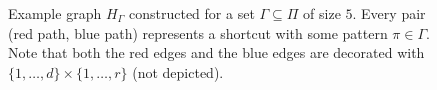 \begin{figure}
	\caption{Example graph $H_\Gamma$ constructed for a set $\Gamma\subseteq \Pi$ of size $5$. Every pair (red path, blue path) represents a shortcut with some pattern $\pi\in \Gamma$. Note that both the red edges and the blue edges are decorated with $\{1,\ldots,d\}\times \{1,\ldots,r\}$ (not depicted).}\label{fig:HGamma}
\end{figure}